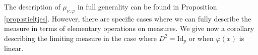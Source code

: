 \documentclass[letterpaper, 10pt, dvipsnames]{article}
\numberwithin{equation}{section}
\newcommand{\Rbb}{\mathbb{R}}
\newcommand{\C}{\mathbb{C}}
\let\d\relax
\newcommand{\d}{\mathrm{d}}
\newtheorem{thm}[ccounter]{Theorem}
\theoremstyle{definition}
\begin{document}
The description of $\mu_{\nu,\varphi}$ in full generality can be found in Proposition \ref{prop:stieltjes}. However, there are specific cases where we can fully describe the measure in terms of elementary operations on measures. We give now a corollary describing the limiting measure in the case where $D^2=\mathrm{Id}_p$ or when $\varphi(x)$ is linear.



\end{document}

